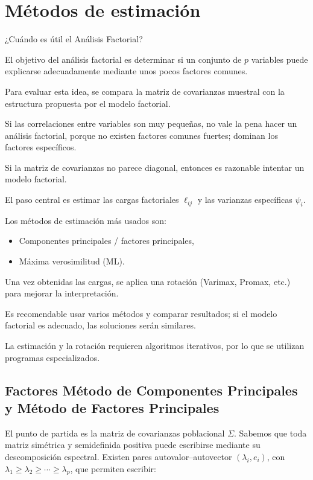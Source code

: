 \documentclass[
]{book}
\begin{document}
\section{Métodos de estimación}\label{muxe9todos-de-estimaciuxf3n}

¿Cuándo es útil el Análisis Factorial?

El objetivo del análisis factorial es determinar si un conjunto de \(p\) variables puede explicarse adecuadamente mediante unos pocos factores comunes.

Para evaluar esta idea, se compara la matriz de covarianzas muestral con la estructura propuesta por el modelo factorial.

Si las correlaciones entre variables son muy pequeñas, no vale la pena hacer un análisis factorial, porque no existen factores comunes fuertes; dominan los factores específicos.

Si la matriz de covarianzas no parece diagonal, entonces es razonable intentar un modelo factorial.

El paso central es estimar las cargas factoriales \(\ell_{ij}\) y las varianzas específicas \(\psi_i\).

Los métodos de estimación más usados son:

\begin{itemize}
\item
  Componentes principales / factores principales,
\item
  Máxima verosimilitud (ML).
\end{itemize}

Una vez obtenidas las cargas, se aplica una rotación (Varimax, Promax, etc.) para mejorar la interpretación.

Es recomendable usar varios métodos y comparar resultados; si el modelo factorial es adecuado, las soluciones serán similares.

La estimación y la rotación requieren algoritmos iterativos, por lo que se utilizan programas especializados.

\subsection{Factores Método de Componentes Principales y Método de Factores Principales}\label{factores-muxe9todo-de-componentes-principales-y-muxe9todo-de-factores-principales}

El punto de partida es la matriz de covarianzas poblacional \(\Sigma\). Sabemos que toda matriz simétrica y semidefinida positiva puede escribirse mediante su descomposición espectral. Existen pares autovalor--autovector \((\lambda_i, e_i)\), con \(\lambda_1 \ge \lambda_2 \ge \cdots \ge \lambda_p\), que permiten escribir:
\end{document}
